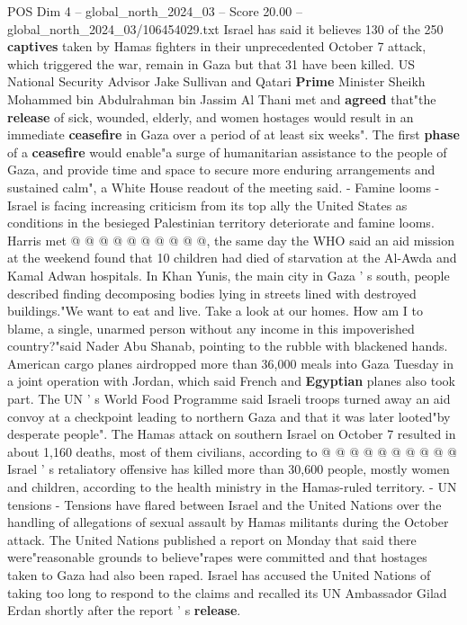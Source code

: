\begin{textsample}{POS Dim 4 – global\_north\_2024\_03 – Score 20.00 – global\_north\_2024\_03/106454029.txt}
Israel has said it believes 130 of the 250 \textbf{captives} taken by Hamas fighters in their unprecedented October 7 attack, which triggered the war, remain in Gaza but that 31 have been killed.
US National Security Advisor Jake Sullivan and Qatari \textbf{Prime} Minister Sheikh Mohammed bin Abdulrahman bin Jassim Al Thani met and \textbf{agreed} that"the \textbf{release} of sick, wounded, elderly, and women hostages would result in an immediate \textbf{ceasefire} in Gaza over a period of at least six weeks".
The first \textbf{phase} of a \textbf{ceasefire} would enable"a surge of humanitarian assistance to the people of Gaza, and provide time and space to secure more enduring arrangements and sustained calm", a White House readout of the meeting said. - Famine looms - Israel is facing increasing criticism from its top ally the United States as conditions in the besieged Palestinian territory deteriorate and famine looms.
Harris met @ @ @ @ @ @ @ @ @ @, the same day the WHO said an aid mission at the weekend found that 10 children had died of starvation at the Al-Awda and Kamal Adwan hospitals.
In Khan Yunis, the main city in Gaza ' s south, people described finding decomposing bodies lying in streets lined with destroyed buildings."We want to eat and live.
Take a look at our homes.
How am I to blame, a single, unarmed person without any income in this impoverished country?"said Nader Abu Shanab, pointing to the rubble with blackened hands.
American cargo planes airdropped more than 36,000 meals into Gaza Tuesday in a joint operation with Jordan, which said French and \textbf{Egyptian} planes also took part.
The UN ' s World Food Programme said Israeli troops turned away an aid convoy at a checkpoint leading to northern Gaza and that it was later looted"by desperate people".
The Hamas attack on southern Israel on October 7 resulted in about 1,160 deaths, most of them civilians, according to @ @ @ @ @ @ @ @ @ @ Israel ' s retaliatory offensive has killed more than 30,600 people, mostly women and children, according to the health ministry in the Hamas-ruled territory. - UN tensions - Tensions have flared between Israel and the United Nations over the handling of allegations of sexual assault by Hamas militants during the October attack.
The United Nations published a report on Monday that said there were"reasonable grounds to believe"rapes were committed and that hostages taken to Gaza had also been raped.
Israel has accused the United Nations of taking too long to respond to the claims and recalled its UN Ambassador Gilad Erdan shortly after the report ' s \textbf{release}.

\end{textsample}
